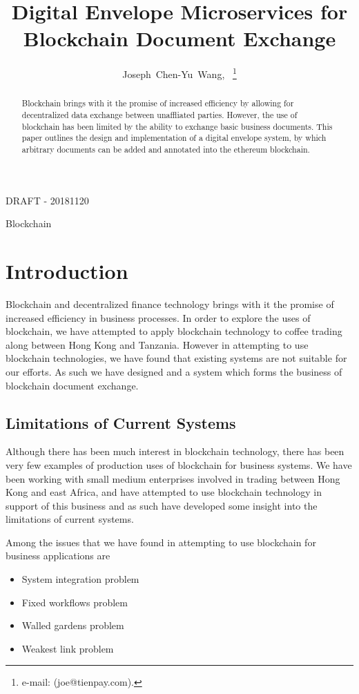 \documentclass[journal]{IEEEtran}
\begin{document}
\title{Digital Envelope Microservices for Blockchain Document Exchange}
\author{Joseph~Chen-Yu~Wang,~
\thanks{e-mail: (joe@tienpay.com).}}
\maketitle

DRAFT - 20181120

\begin{abstract}
Blockchain brings with it the promise of increased efficiency by
allowing for decentralized data exchange between unaffliated parties.
However, the use of blockchain has been limited by the ability to
exchange basic business documents.  This paper outlines the design and
implementation of a digital envelope system, by which arbitrary
documents can be added and annotated into the ethereum blockchain.
\end{abstract}


\begin{IEEEkeywords}
Blockchain
\end{IEEEkeywords}

\section{Introduction}
Blockchain and decentralized finance technology brings with it the
promise of increased efficiency in business processes.  In order to
explore the uses of blockchain, we have attempted to apply blockchain
technology to coffee trading along between Hong Kong and Tanzania.
However in attempting to use blockchain technologies, we have found
that existing systems are not suitable for our efforts.  As such we
have designed and a system which forms the business of blockchain
document exchange.

\subsection{Limitations of Current Systems}

Although there has been much interest in blockchain technology, there
has been very few examples of production uses of blockchain for
business systems.  We have been working with small medium enterprises
involved in trading between Hong Kong and east Africa, and have
attempted to use blockchain technology in support of this business and
as such have developed some insight into the limitations of current
systems.

Among the issues that we have found in attempting to use blockchain
for business applications are
\begin{itemize}
 \item System integration problem
 \item Fixed workflows problem
 \item Walled gardens problem
 \item Weakest link problem
\end{itemize}
\end{document}
